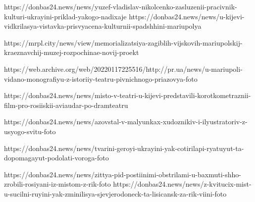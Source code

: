  
 
 
 
 

https://donbas24.news/news/yuzef-vladislav-nikolcenko-zasluzenii-pracivnik-kulturi-ukrayini-priklad-yakogo-nadixaje
https://donbas24.news/news/u-kijevi-vidkrilasya-vistavka-prisvyacena-kulturnii-spadshhini-mariupolya

https://mrpl.city/news/view/memorializatsiya-zagiblih-vijskovih-mariupolskij-kraeznavchij-muzej-rozpochinae-novij-proekt

https://web.archive.org/web/20220117225516/http://pr.ua/news/u-mariupoli-vidano-monografiyu-z-istoriiy-teatru-pivnichnogo-priazovya-foto

https://donbas24.news/news/misto-v-teatri-u-kijevi-predstavili-korotkometraznii-film-pro-rosiiskii-aviaudar-po-dramteatru

https://donbas24.news/news/azovstal-v-malyunkax-xudoznikiv-i-ilyustratoriv-z-usyogo-svitu-foto

https://donbas24.news/news/tvarini-geroyi-ukrayini-yak-cotirilapi-ryatuyut-ta-dopomagayut-podolati-voroga-foto

https://donbas24.news/news/zittya-pid-postiinimi-obstrilami-u-baxmuti-shho-zrobili-rosiyani-iz-mistom-z-rik-foto
https://donbas24.news/news/z-kvitucix-mist-u-sucilni-ruyini-yak-zminilisya-sjevjerodoneck-ta-lisicansk-za-rik-viini-foto

